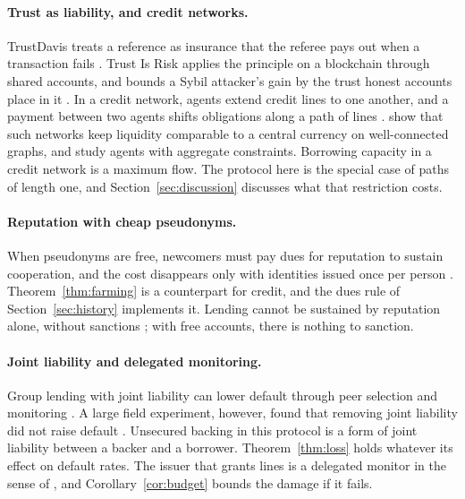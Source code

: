 \documentclass[acmsmall,nonacm,screen]{acmart}
\theoremstyle{acmdefinition}%
\begin{document}
\paragraph{Trust as liability, and credit networks.} TrustDavis treats a reference as insurance
that the referee pays out when a transaction fails \citep{defigueiredo2005trustdavis}. Trust Is Risk
applies the principle on a blockchain through shared accounts, and bounds a Sybil attacker's gain by
the trust honest accounts place in it \citep{litos2017trust}. In a credit network, agents extend
credit lines to one another, and a payment between two agents shifts obligations along a path of
lines \citep{ghosh2007trust,karlan2009trust}. \citet{dandekar2011liquidity} show that such networks
keep liquidity comparable to a central currency on well-connected graphs, and
\citet{ramseyer2020liquidity} study agents with aggregate constraints. Borrowing capacity in a credit
network is a maximum flow. The protocol here is the special case of paths of length one, and
Section~\ref{sec:discussion} discusses what that restriction costs.

\paragraph{Reputation with cheap pseudonyms.} When pseudonyms are free, newcomers must pay dues for
reputation to sustain cooperation, and the cost disappears only with identities issued once per
person \citep{friedman2001cheap}. Theorem~\ref{thm:farming} is a counterpart for credit, and the dues
rule of Section~\ref{sec:history} implements it. Lending cannot be sustained by reputation alone,
without sanctions \citep{bulow1989sovereign}; with free accounts, there is nothing to sanction.

\paragraph{Joint liability and delegated monitoring.} Group lending with joint liability can lower
default through peer selection and monitoring \citep{stiglitz1990peer,besley1995group,ghatak1999joint}.
A large field experiment, however, found that removing joint liability did not raise default
\citep{gine2014group}. Unsecured backing in this protocol is a form of joint liability between a
backer and a borrower. Theorem~\ref{thm:loss} holds whatever its effect on default rates. The issuer
that grants lines is a delegated monitor in the sense of \citet{diamond1984delegated}, and
Corollary~\ref{cor:budget} bounds the damage if it fails.
\end{document}
